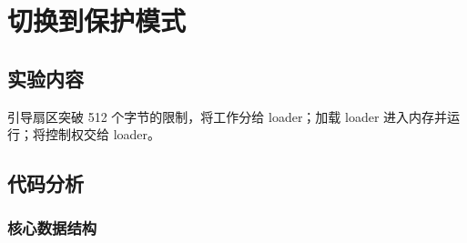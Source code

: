 \chapter{切换到保护模式}\label{cha:latex-brief-intro}

\section{实验内容}
引导扇区突破 512 个字节的限制，将工作分给 loader；加载 loader 进入内存并运行；将控制权交给 loader。

\section{代码分析}

\subsection{核心数据结构}


